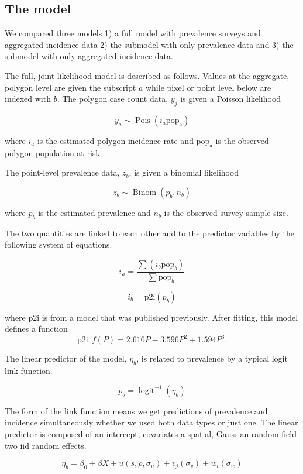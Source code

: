 \documentclass[10pt,letterpaper]{article}
\begin{document}
\subsection*{The model}

We compared three models 1) a full model with prevalence surveys and aggregated incidence data 2) the submodel with only prevalence data and 3) the submodel with only aggregated incidence data.

The full, joint likelihood model is described as follows. 
Values at the aggregate, polygon level are given the subscript $a$ while pixel or point level below are indexed with $b$.
The polygon case count data, $y_j$ is given a Poisson likelihood

$$y_a \sim \operatorname{Pois}(i_a\mathrm{pop_a})$$

where $i_a$ is the estimated polygon incidence rate and $\mathrm{pop_a}$ is the observed polygon population-at-risk.

The point-level prevalence data, $z_b$, is given a binomial likelihood

$$z_b \sim \operatorname{Binom}(p_b, n_b) $$

where $p_b$ is the estimated prevalence and $n_b$ is the observed survey sample size. 

The two quantities are linked to each other and to the predictor variables by the following system of equations.

$$i_a = \frac{ \sum(i_b \mathrm{pop}_b)}{\sum  \mathrm{pop}_b} $$

$$i_b = \mathrm{p2i}(p_b)$$

where $\mathrm{p2i}$ is from a model that was published previously. \cite{cameron2015defining}
After fitting, this model defines a function
$$\mathrm{p2i}: f\left(P\right) = 2.616P - 3.596P^2 + 1.594P^3.$$

The linear predictor of the model, $\eta_b$, is related to prevalence by a typical logit link function.

$$p_b = \operatorname{logit}^{-1}(\eta_b)$$


The form of the link function means we get predictions of prevalence and incidence simultaneously whether we used both data types or just one.
The linear predictor is composed of an intercept, covariates a spatial, Gaussian random field two iid random effects.

$$\eta_b = \beta_0 + \beta X  + u(s, \rho, \sigma_u) + v_j(\sigma_v) + w_i(\sigma_w)$$
\end{document}
